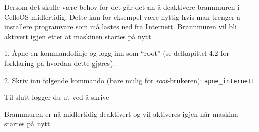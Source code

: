 Dersom det skulle v\ae re behov for det g\aa r det an \aa{} deaktivere brannmuren i CelleOS midlertidig. Dette kan for eksempel v\ae re nyttig hvis man trenger \aa{} installere programvare som m\aa{} lastes ned fra Internett. Brannmuren vil bli aktivert igjen etter at maskinen startes p\aa{} nytt. 
\item{1.} \AA pne en kommandolinje og logg inn som ``root'' (se delkapittel 4.2 for forklaring p\aa{} hvordan dette gj\o res).
\item{2.} Skriv inn f\o lgende kommando (bare mulig for {\it root}-brukeren):
\medskip
{\tt apne\_internett}
\medskip
\item{} Til slutt logger du ut ved \aa{} skrive
\medskip
{}
\medskip
\item{} Brannmuren er n\aa{} midlertidig deaktivert og vil aktiveres igjen n\aa r maskina startes p\aa{} nytt.
\vfill\eject\bye
